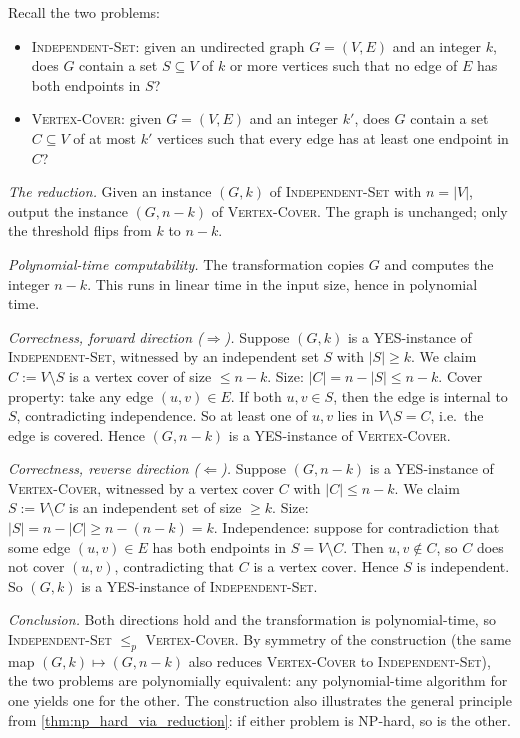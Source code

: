 \begin{example}
\label{ex:toy_reduction}
Recall the two problems:
\begin{itemize}
  \item \textsc{Independent-Set}: given an undirected graph $G = (V, E)$ and an integer $k$, does $G$ contain a set $S \subseteq V$ of $k$ or more vertices such that no edge of $E$ has both endpoints in $S$?
  \item \textsc{Vertex-Cover}: given $G = (V, E)$ and an integer $k'$, does $G$ contain a set $C \subseteq V$ of at most $k'$ vertices such that every edge has at least one endpoint in $C$?
\end{itemize}

\medskip
\noindent\textit{The reduction.} Given an instance $(G, k)$ of \textsc{Independent-Set} with $n = |V|$, output the instance $(G, n - k)$ of \textsc{Vertex-Cover}. The graph is unchanged; only the threshold flips from $k$ to $n - k$.

\medskip
\noindent\textit{Polynomial-time computability.} The transformation copies $G$ and computes the integer $n - k$. This runs in linear time in the input size, hence in polynomial time.

\medskip
\noindent\textit{Correctness, forward direction ($\Rightarrow$).} Suppose $(G, k)$ is a YES-instance of \textsc{Independent-Set}, witnessed by an independent set $S$ with $|S| \ge k$. We claim $C := V \setminus S$ is a vertex cover of size $\le n - k$. Size: $|C| = n - |S| \le n - k$. Cover property: take any edge $(u, v) \in E$. If both $u, v \in S$, then the edge is internal to $S$, contradicting independence. So at least one of $u, v$ lies in $V \setminus S = C$, i.e.\ the edge is covered. Hence $(G, n-k)$ is a YES-instance of \textsc{Vertex-Cover}.

\medskip
\noindent\textit{Correctness, reverse direction ($\Leftarrow$).} Suppose $(G, n-k)$ is a YES-instance of \textsc{Vertex-Cover}, witnessed by a vertex cover $C$ with $|C| \le n - k$. We claim $S := V \setminus C$ is an independent set of size $\ge k$. Size: $|S| = n - |C| \ge n - (n-k) = k$. Independence: suppose for contradiction that some edge $(u, v) \in E$ has both endpoints in $S = V \setminus C$. Then $u, v \notin C$, so $C$ does not cover $(u, v)$, contradicting that $C$ is a vertex cover. Hence $S$ is independent. So $(G, k)$ is a YES-instance of \textsc{Independent-Set}.

\medskip
\noindent\textit{Conclusion.} Both directions hold and the transformation is polynomial-time, so \textsc{Independent-Set} $\le_p$ \textsc{Vertex-Cover}. By symmetry of the construction (the same map $(G, k) \mapsto (G, n-k)$ also reduces \textsc{Vertex-Cover} to \textsc{Independent-Set}), the two problems are polynomially equivalent: any polynomial-time algorithm for one yields one for the other. The construction also illustrates the general principle from \cref{thm:np_hard_via_reduction}: if either problem is NP-hard, so is the other.
\end{example}

